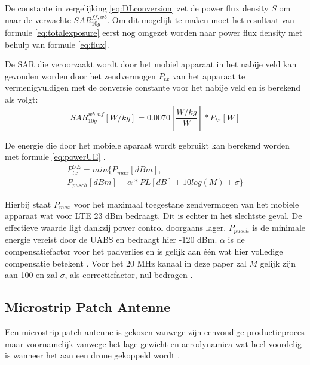 \documentclass[twocolumn]{phdsymp_dutch}
\begin{document}
De constante in vergelijking \ref{eq:DLconversion} zet de \gls{power flux density} $S$ om  naar de verwachte $SAR^{ff,wb}_{10g}$.
Om dit mogelijk te maken moet 
het resultaat van formule \ref{eq:totalexposure} eerst nog omgezet worden naar \gls{power flux density} met behulp van formule
\ref{eq:flux}.

De \gls{SAR} die veroorzaakt wordt door het mobiel apparaat in het nabije veld kan gevonden worden door 
het zendvermogen $P_{tx}$ van het  apparaat te vermenigvuldigen met de conversie constante voor het nabije veld
en is berekend als volgt:
\begin{equation} 
SAR^{wb,nf}_{10g} [W/kg] = 0.0070 \left[\frac{W/kg}{W}\right] * P_{tx} [W]
\label{eq:ulToSar}
\end{equation}

De energie die door het mobiele aparaat wordt gebruikt kan berekend worden met formule \ref{eq:powerUE} \cite{J22_plets2015joint}.
\begin{multline} 
P_{tx}^{UE} = min \big\{P_{max} [dBm] , \\
 P_{pusch} [dBm] + \alpha * PL [dB] + 10log(M) + \sigma \big\}
\label{eq:powerUE}
\end{multline}


Hierbij staat $P_{max}$ voor het maximaal toegestane zendvermogen van het mobiele apparaat wat voor LTE 23 dBm bedraagt.
Dit is echter in het slechtste geval. De effectieve waarde ligt dankzij power control doorgaans lager.
$P_{pusch}$ is de minimale energie vereist door de 
\gls{UABS} en bedraagt hier -120 dBm. 
$\alpha$ is de compensatiefactor voor het padverlies en is gelijk aan \'e\'en wat hier volledige compensatie betekent \cite{J32,J33}.
Voor het 20 MHz kanaal in deze paper zal $M$ gelijk zijn aan 100 en
 zal $\sigma$,  als correctiefactor, nul bedragen \cite{J22_plets2015joint,J32}.

\subsection{Microstrip Patch Antenne}
Een microstrip patch antenne is gekozen vanwege zijn eenvoudige productieproces maar voornamelijk vanwege het
 lage gewicht en aerodynamica wat heel voordelig is wanneer het aan een drone gekoppeld wordt \cite{J13_microstripadvantages}.
\end{document}
